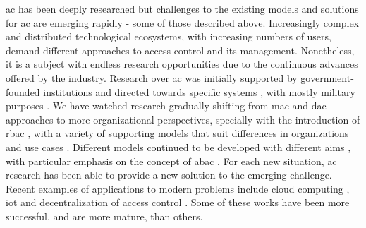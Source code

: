 \gls{ac} has been deeply researched but challenges to the existing models and solutions for \gls{ac} are emerging rapidly - some of those described above. Increasingly complex and distributed technological ecosystems, with increasing numbers of users, demand different approaches to access control and its management. Nonetheless, it is a subject with endless research opportunities due to the continuous advances offered by the industry. Research over \gls{ac} was initially supported by government-founded institutions \cite{lampson_protection_1974, graham_protection:_1972, harrison_protection_1976} and directed towards specific systems \cite{weissman_security_1969,  organick_multics_1972, satyanarayanan_integrating_1989}, with mostly military purposes \cite{biba_integrity_1977, bell_secure_1973}. We have watched research gradually shifting from \gls{mac} \cite{bell_secure_1973, denning_lattice_1976, biba_integrity_1977, sandhu_lattice-based_1993} and \gls{dac} \cite{weissman_security_1969,  organick_multics_1972, graham_protection:_1972,lampson_protection_1974, harrison_protection_1976, sandhu_typed_1992} approaches to more organizational perspectives, specially with the introduction of \gls{rbac} \cite{ferraiolo_role-based_1992, sandhu_role-based_1996}, with a variety of supporting models \cite{bertino_trbac:_2000, chakraborty_trustbac:_2006, joshi_generalized_2005, ray_lrbac:_2006, thomas_team-based_1997}  that suit differences in organizations and use cases \cite{barkley_role_1997, gavrila_formal_1998, park_rbac_1999, park_role-based_2003}. Different models continued to be developed with different aims \cite{park_towards_2002, kalam_organization_2003, sandhu_usage_2003}, with particular emphasis on the concept of \gls{abac} \cite{wang_logic-based_2004, yuan_attributed_2005, goyal_attribute-based_2006, wang_hierarchical_2010, yu_attribute_2010, hu_guide_2014}. For each new situation, \gls{ac} research has been able to provide a new solution to the emerging challenge. Recent examples of applications to modern problems include cloud computing \cite{wang_hierarchical_2010, yu_attribute_2010, wan_hasbe:_2012, ruj_dacc:_2011,calero_toward_2010}, \gls{iot} \cite{ouaddah_access_2017, dorri_blockchain_2017} and decentralization of access control \cite{sandhu_peer--peer_2005, sandhu_decentralized_1998, miltchev_decentralized_2008}. Some of these works have been more successful, and are more mature, than others.

